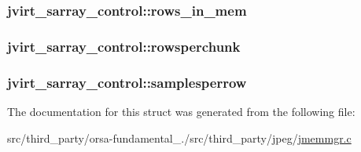 \subsubsection[{rows\+\_\+in\+\_\+mem}]{ jvirt\+\_\+sarray\+\_\+control\+::rows\+\_\+in\+\_\+mem}\label{structjvirt__sarray__control_aac15348d4b307c8aacc631b96aa3b547}
\hypertarget{structjvirt__sarray__control_ad1c55661955e1600d447ad754c6aece1}{}
\subsubsection[{rowsperchunk}]{ jvirt\+\_\+sarray\+\_\+control\+::rowsperchunk}\label{structjvirt__sarray__control_ad1c55661955e1600d447ad754c6aece1}
\hypertarget{structjvirt__sarray__control_a3b6c756c3a71dc8023672093a60cc4f1}{}
\subsubsection[{samplesperrow}]{ jvirt\+\_\+sarray\+\_\+control\+::samplesperrow}\label{structjvirt__sarray__control_a3b6c756c3a71dc8023672093a60cc4f1}


The documentation for this struct was generated from the following file\+:\begin{DoxyCompactItemize}
\item 
src/third\+\_\+party/orsa-\/fundamental\+\_./src/third\+\_\+party/jpeg/\hyperlink{jmemmgr_8c}{jmemmgr.\+c}\end{DoxyCompactItemize}
